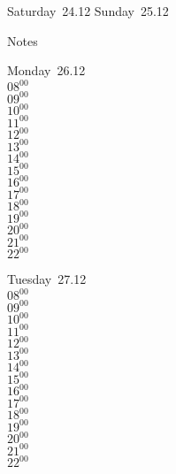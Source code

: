 \documentclass[11pt,a4paper]{book}\usepackage[]{graphicx}\usepackage[]{color}
\begin{document}
\begin{weekendbox}
  Saturday~24.12
  \tcblower
  Sunday~25.12
\end{weekendbox} %
\begin{notebox}
  Notes
\end{notebox}
\clearpage
\begin{headerbox}
\end{headerbox}
\begin{weekdaybox}
  Monday~26.12\\
  { 
  \vfill
  $08^{00}$\\
$09^{00}$\\
$10^{00}$\\
$11^{00}$\\
$12^{00}$\\
$13^{00}$\\
$14^{00}$\\
$15^{00}$\\
$16^{00}$\\
$17^{00}$\\
$18^{00}$\\
$19^{00}$\\
$20^{00}$\\
$21^{00}$\\
$22^{00}$\\
  }
\end{weekdaybox}
\begin{weekdaybox}
  Tuesday~27.12\\
  { 
  \vfill
  $08^{00}$\\
$09^{00}$\\
$10^{00}$\\
$11^{00}$\\
$12^{00}$\\
$13^{00}$\\
$14^{00}$\\
$15^{00}$\\
$16^{00}$\\
$17^{00}$\\
$18^{00}$\\
$19^{00}$\\
$20^{00}$\\
$21^{00}$\\
$22^{00}$\\
  }
\end{weekdaybox}
\end{document}
